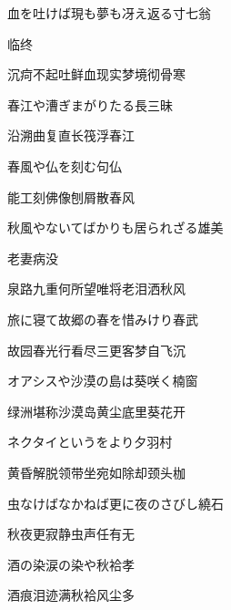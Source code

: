 \begin{haiku}
    {\FH 血を吐けば現も夢も冴え返る}\hfill{\FH 寸七翁}

    {\FK 临终}

    {\FK 沉疴不起吐鲜血现实梦境彻骨寒}
\end{haiku}

\begin{haiku}
    {\FH 春江や漕ぎまがりたる長}\hfill{\FH 三昧}

    {\FK 沿溯曲复直长筏浮春江}
\end{haiku}

\begin{haiku}
    {\FH 春風や仏を刻む}\hfill{\FH 句仏}

    {\FK 能工刻佛像刨屑散春风}
\end{haiku}

\begin{haiku}
    {\FH 秋風やないてばかりも居られざる}\hfill{\FH 雄美}

    {\FK 老妻病没}

    {\FK 泉路九重何所望唯将老泪洒秋风}
\end{haiku}

\begin{haiku}
    {\FH 旅に寝て故郷の春を惜みけり}\hfill{\FH 春武}

    {\FK 故园春光行看尽三更客梦自飞沉}
\end{haiku}

\begin{haiku}
    {\FH オアシスや沙漠の島は葵咲く}\hfill{\FH 楠窗}

    {\FK 绿洲堪称沙漠岛黄尘底里葵花开}
\end{haiku}

\begin{haiku}
    {\FH ネクタイというをより夕}\hfill{\FH 羽村}

    {\FK 黄昏解脱领带坐宛如除却颈头枷}
\end{haiku}

\begin{haiku}
    {\FH 虫なけばなかねば更に夜のさびし}\hfill{\FH 繞石}

    {\FK 秋夜更寂静虫声任有无}
\end{haiku}

\begin{haiku}
    {\FH 酒の染涙の染や秋袷}\hfill{\FH 孝}

    {\FK 酒痕泪迹满秋袷风尘多}
\end{haiku}

